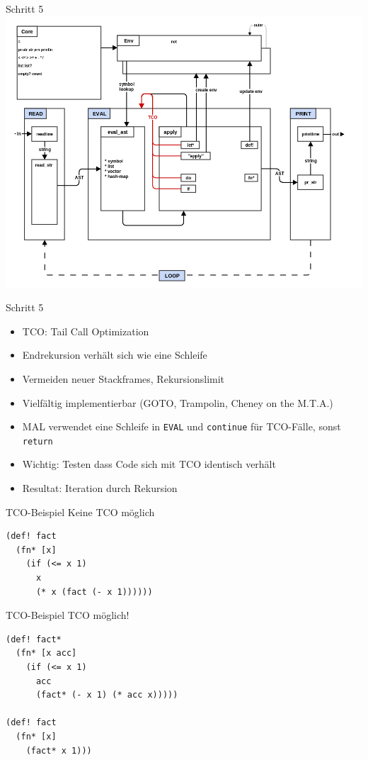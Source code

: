 \documentclass[presentation]{beamer}
\begin{document}
\begin{frame}[label=sec-3-16]{Schritt 5}
\includegraphics[width=.9\linewidth]{./images/step5_tco.png}
\end{frame}

\begin{frame}[fragile,label=sec-3-17]{Schritt 5}
 \begin{itemize}
\item TCO: Tail Call Optimization
\item Endrekursion verhält sich wie eine Schleife
\item Vermeiden neuer Stackframes, Rekursionslimit
\item Vielfältig implementierbar (GOTO, Trampolin, Cheney on the M.T.A.)
\item MAL verwendet eine Schleife in \texttt{EVAL} und \texttt{continue} für TCO-Fälle,
sonst \texttt{return}
\item Wichtig: Testen dass Code sich mit TCO identisch verhält
\item Resultat: Iteration durch Rekursion
\end{itemize}
\end{frame}

\begin{frame}[fragile,label=sec-3-18]{TCO-Beispiel}
 Keine TCO möglich

\begin{verbatim}
(def! fact
  (fn* [x]
    (if (<= x 1)
      x
      (* x (fact (- x 1))))))
\end{verbatim}
\end{frame}

\begin{frame}[fragile,label=sec-3-19]{TCO-Beispiel}
 TCO möglich!

\begin{verbatim}
(def! fact*
  (fn* [x acc]
    (if (<= x 1)
      acc
      (fact* (- x 1) (* acc x)))))

(def! fact
  (fn* [x]
    (fact* x 1)))
\end{verbatim}
\end{frame}
\end{document}
